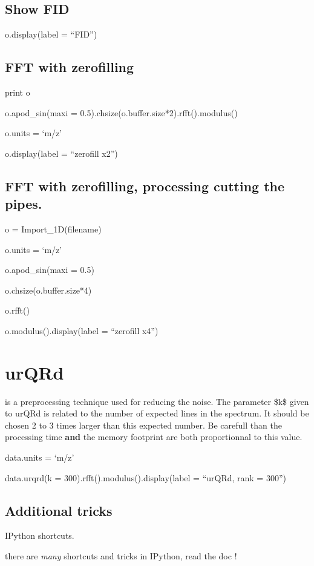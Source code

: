 \documentclass[letterpaper,10pt,openany,oneside]{sphinxmanual}
\begin{document}
\subsection{Show FID}
\label{rst/tutorial:show-fid}
o.display(label = ``FID'')


\subsection{FFT with zerofilling}
\label{rst/tutorial:fft-with-zerofilling}
print o

o.apod\_sin(maxi = 0.5).chsize(o.buffer.size*2).rfft().modulus()

o.units = `m/z'

o.display(label = ``zerofill x2'')


\subsection{FFT with zerofilling, processing cutting the pipes.}
\label{rst/tutorial:fft-with-zerofilling-processing-cutting-the-pipes}
o = Import\_1D(filename)

o.units = `m/z'

o.apod\_sin(maxi = 0.5)

o.chsize(o.buffer.size*4)

o.rfft()

o.modulus().display(label = ``zerofill x4'')


\section{urQRd}
\label{rst/tutorial:urqrd}
is a preprocessing technique used for reducing the noise.
The parameter \$k\$ given to urQRd is related to the number of expected lines in the spectrum.
It should be chosen 2 to 3 times larger than this expected number.
Be carefull than the processing time \textbf{and} the memory footprint are both proportionnal to this value.

data.units = `m/z'

data.urqrd(k = 300).rfft().modulus().display(label = ``urQRd, rank = 300'')


\subsection{Additional tricks}
\label{rst/tutorial:additional-tricks}
IPython shortcuts.

there are \emph{many} shortcuts and tricks in IPython, read the doc !
\end{document}
